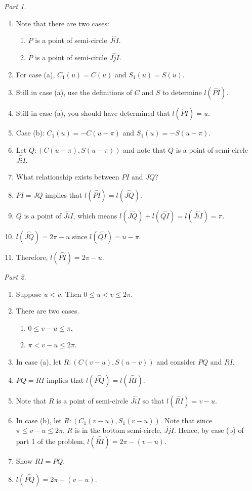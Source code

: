 \documentclass[english]{book}
\newcommand{\arc}[1]{\overset{\frown}{#1} }
\begin{document}
\emph{Part 1.} 
\begin{enumerate}[\hspace{1cm}1)]
  \item Note that there are two cases:
    \begin{enumerate}[\hspace{1cm}a)]
      \item $P$ is a point of semi-circle $\arc{JiI}$.
      \item $P$ is a point of semi-circle $\arc{JjI}$.
    \end{enumerate}
  \item For case (a), $C_{1}(u) = C(u)$ and $S_{1}(u) = S(u)$.
  \item Still in case (a), use the definitions of $C$ and $S$ to determine $l(\arc{PI})$.
  \item Still in case (a), you should have determined that $l(\arc{PI}) = u$.
  \item Case (b): $C_{1}(u) = -C(u-\pi)$ and $S_{1}(u) = -S(u-\pi)$.
  \item Let $Q:(C(u-\pi), S(u-\pi))$ and note that $Q$ is a point of semi-circle $\arc{JiI}$.
  \item What relationship exists between $PI$ and $JQ$?
  \item $PI=JQ$ implies that $l(\arc{PI}) = l(\arc{JQ})$.
  \item $Q$ is a point of $\arc{JiI}$, which means $l(\arc{JQ}) + l(\arc{QI}) = l(\arc{JiI}) = \pi$.
  \item $l(\arc{JQ}) = 2\pi - u$ since $l(\arc{QI}) = u - \pi$.
  \item Therefore, $l(\arc{PI}) = 2\pi - u$.
\end{enumerate}

\emph{Part 2.}
\begin{enumerate}[\hspace{1cm}1)]
  \item Suppose $u<v$. Then $0 \leq u < v \leq 2\pi$.
  \item There are two cases.
    \begin{enumerate}[\hspace{1cm}a)]
      \item $0 \leq v-u \leq \pi$,
      \item $\pi < v-u \leq 2\pi$.
    \end{enumerate}
  \item In case (a), let $R:(C(v-u),S(u-v))$ and consider $PQ$ and $RI$.
  \item $PQ = RI$ implies that $l(\arc{PQ}) = l(\arc{RI})$.
  \item Note that $R$ is a point of semi-circle $\arc{JiI}$ so that $l(\arc{RI}) = v - u$.
  \item In case (b), let $R:(C_{1}(v-u),S_{1}(v-u))$. Note that since $\pi \leq v-u \leq 2\pi$, $R$ is in the bottom semi-circle, $\arc{JjI}$. Hence, by case (b) of part 1 of the problem, $l(\arc{RI}) = 2\pi - (v-u)$.
  \item Show $RI = PQ$.
  \item $l(\arc{PQ}) = 2\pi - (v-u)$.
\end{enumerate}
\end{document}
